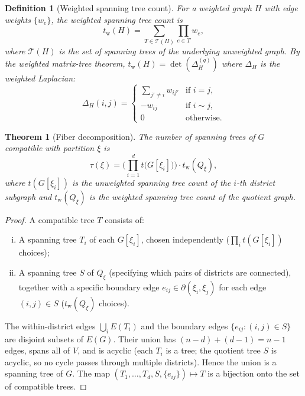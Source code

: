 \documentclass[11pt]{article}
\newtheorem{definition}{Definition}[section]
\newtheorem{theorem}{Theorem}[section]
\newcommand{\tw}{t_{\mathrm{w}}}
\begin{document}
\begin{definition}[Weighted spanning tree count]\label{def:weighted-tree}
For a weighted graph $H$ with edge weights $\{w_e\}$, the \emph{weighted
spanning tree count} is
\[
  \tw(H) = \sum_{T \in \mathcal{T}(H)} \prod_{e \in T} w_e,
\]
where $\mathcal{T}(H)$ is the set of spanning trees of the underlying unweighted
graph. By the weighted matrix-tree theorem, $\tw(H) = \det(\Delta_H^{(q)})$ where
$\Delta_H$ is the weighted Laplacian:
\[
  \Delta_H(i,j) =
  \begin{cases}
    \sum_{j' \neq i} w_{ij'} & \text{if } i = j, \\
    -w_{ij}                   & \text{if } i \sim j, \\
    0                         & \text{otherwise.}
  \end{cases}
\]
\end{definition}

\begin{theorem}[Fiber decomposition]\label{thm:fiber}
The number of spanning trees of $G$ compatible with partition $\xi$ is
\[
  \tau(\xi) = \biggl(\prod_{i=1}^d t\bigl(G[\xi_i]\bigr)\biggr) \cdot \tw(Q_{\xi}),
\]
where $t(G[\xi_i])$ is the unweighted spanning tree count of the $i$-th district
subgraph and $\tw(Q_{\xi})$ is the weighted spanning tree count of the quotient graph.
\end{theorem}

\begin{proof}
A compatible tree $T$ consists of:
\begin{enumerate}[(i)]
  \item A spanning tree $T_i$ of each $G[\xi_i]$, chosen independently
    ($\prod_i t(G[\xi_i])$ choices);
  \item A spanning tree $S$ of $Q_{\xi}$ (specifying which pairs of districts are
    connected), together with a specific boundary edge
    $e_{ij} \in \partial(\xi_i, \xi_j)$ for each edge $(i,j) \in S$
    ($\tw(Q_{\xi})$ choices).
\end{enumerate}
The within-district edges $\bigcup_i E(T_i)$ and the boundary edges
$\{e_{ij} : (i,j) \in S\}$ are disjoint subsets of $E(G)$. Their union has
$(n - d) + (d - 1) = n - 1$ edges, spans all of $V$, and is acyclic (each
$T_i$ is a tree; the quotient tree $S$ is acyclic, so no cycle passes through
multiple districts). Hence the union is a spanning tree of $G$. The map
$(T_1, \ldots, T_d, S, \{e_{ij}\}) \mapsto T$ is a bijection onto the set of
compatible trees.
\end{proof}
\end{document}
